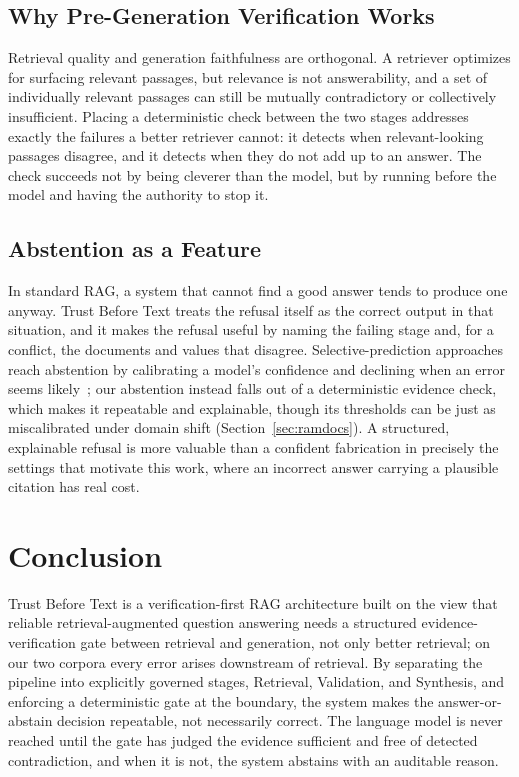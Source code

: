 \documentclass[conference]{IEEEtran}
\begin{document}
\subsection{Why Pre-Generation Verification Works}
Retrieval quality and generation faithfulness are orthogonal. A retriever
optimizes for surfacing relevant passages, but relevance is not
answerability, and a set of individually relevant passages can still be
mutually contradictory or collectively insufficient. Placing a
deterministic check between the two stages addresses exactly the failures a
better retriever cannot: it detects when relevant-looking passages disagree,
and it detects when they do not add up to an answer. The check succeeds not
by being cleverer than the model, but by running before the model and
having the authority to stop it.

\subsection{Abstention as a Feature}
In standard RAG, a system that cannot find a good answer tends to produce
one anyway. Trust Before Text treats the refusal itself as the correct
output in that situation, and it makes the refusal useful by naming the
failing stage and, for a conflict, the documents and values that disagree.
Selective-prediction approaches reach abstention by calibrating a model's
confidence and declining when an error seems likely~\cite{kamath2020selective};
our abstention instead falls out of a deterministic evidence check, which
makes it repeatable and explainable, though its thresholds can be just as
miscalibrated under domain shift (Section~\ref{sec:ramdocs}).
A structured, explainable refusal is more valuable than a confident
fabrication in precisely the settings that motivate this work, where an
incorrect answer carrying a plausible citation has real cost.

\section{Conclusion}
\label{sec:conclusion}

Trust Before Text is a verification-first RAG architecture built on the
view that reliable retrieval-augmented question answering needs a
structured evidence-verification gate between retrieval and generation, not
only better retrieval; on our two corpora every error arises downstream of
retrieval. By separating
the pipeline into explicitly governed stages, Retrieval, Validation, and
Synthesis, and enforcing a deterministic gate at the boundary, the system
makes the answer-or-abstain decision repeatable, not necessarily correct.
The language model is never reached until the gate has judged the evidence
sufficient and free of detected contradiction, and when it is not, the
system abstains with an auditable reason.
\end{document}
